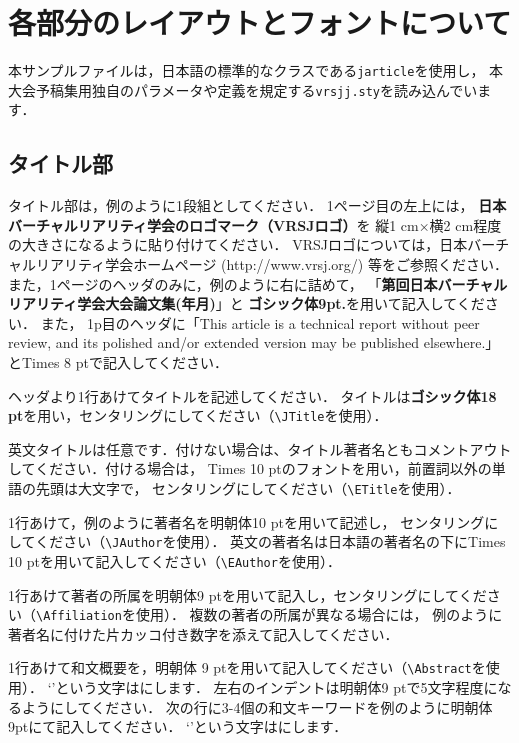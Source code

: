 \documentclass[a4paper]{jarticle}
\newcounter{vrsjyear}
\newcounter{vrsjmonth}
\newcounter{vrsjnum}
\begin{document}
\section{各部分のレイアウトとフォントについて}%

本サンプルファイルは，日本語\LaTeXe の標準的なクラスである\verb+jarticle+を使用し，
本大会予稿集用独自のパラメータや定義を規定する\verb+vrsjj.sty+を読み込んでいます．

\subsection{タイトル部}

タイトル部は，例のように1段組としてください．
1ページ目の左上には，
{\bf 日本バーチャルリアリティ学会のロゴマーク（VRSJロゴ）}を
縦1 cm×横2 cm程度の大きさになるように貼り付けてください．
VRSJロゴについては，日本バーチャルリアリティ学会ホームページ
 (http://www.vrsj.org/) 等をご参照ください．
また，1ページのヘッダのみに，例のように右に詰めて，
「{\bf 第回日本バーチャルリアリティ学会大会論文集(年月)}」と
{\bf ゴシック体9pt.}を用いて記入してください．
また，
1p目のヘッダに「This article is a technical report without peer review, and its polished and/or extended version may be published elsewhere.」と{\footnotesize Times 8 pt}で記入してください．

ヘッダより1行あけてタイトルを記述してください．
タイトルは{\bf ゴシック体18 pt}を用い，センタリングにしてください（\verb+\JTitle+を使用）．

英文タイトルは任意です．付けない場合は、タイトル著者名ともコメントアウトしてください．付ける場合は，
{\normalsize Times 10 pt}のフォントを用い，前置詞以外の単語の先頭は大文字で，
センタリングにしてください（\verb+\ETitle+を使用）．

1行あけて，例のように著者名を{\normalsize 明朝体10 pt}を用いて記述し，
センタリングにしてください（\verb+\JAuthor+を使用）．
英文の著者名は日本語の著者名の下にTimes 10 ptを用いて記入してください（\verb+\EAuthor+を使用）．

1行あけて著者の所属を明朝体9 ptを用いて記入し，センタリングにしてください（\verb+\Affiliation+を使用）．
複数の著者の所属が異なる場合には，
例のように著者名に付けた片カッコ付き数字を添えて記入してください．

1行あけて和文概要を，明朝体 9 ptを用いて記入してください（\verb+\Abstract+を使用）．
`'という文字はにします．
左右のインデントは明朝体9 ptで5文字程度になるようにしてください．
次の行に3-4個の和文キーワードを例のように明朝体9ptにて記入してください．
`'という文字はにします．
\end{document}
